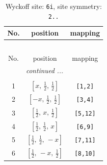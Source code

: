 \documentclass[fleqn,8pt]{jsarticle}
\begin{document}
\renewcommand{\arraystretch}{1.2}
\begin{longtable}{ccc}
\caption{Wyckoff site: {\tt 6i}, site symmetry: {\tt 2..}}
 \\
 \hline \hline
No. & position & mapping \\ \hline \endfirsthead

\multicolumn{2}{l}{\tablename\ \thetable{}} \\
 \hline \hline
No. & position & mapping \\ \hline \endhead

 \hline \hline
\multicolumn{2}{r}{\footnotesize\it continued ...} \\ \endfoot

 \hline \hline
\multicolumn{2}{r}{} \\ \endlastfoot

1 & $\left[ x,\, \frac{1}{2},\, \frac{1}{2} \right]$ & {\tt [1,2]} \\ \hline
2 & $\left[ - x,\, \frac{1}{2},\, \frac{1}{2} \right]$ & {\tt [3,4]} \\ \hline
3 & $\left[ \frac{1}{2},\, x,\, \frac{1}{2} \right]$ & {\tt [5,12]} \\ \hline
4 & $\left[ \frac{1}{2},\, \frac{1}{2},\, x \right]$ & {\tt [6,9]} \\ \hline
5 & $\left[ \frac{1}{2},\, \frac{1}{2},\, - x \right]$ & {\tt [7,11]} \\ \hline
6 & $\left[ \frac{1}{2},\, - x,\, \frac{1}{2} \right]$ & {\tt [8,10]} \\
\end{longtable}
\renewcommand{\arraystretch}{1.2}
\end{document}
